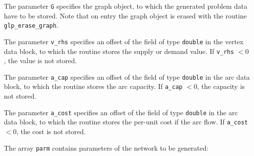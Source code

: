 The parameter \verb|G| specifies the graph object, to which the
generated  problem data have to be stored. Note that on entry the graph
object  is erased with the routine \verb|glp_erase_graph|.

The parameter \verb|v_rhs| specifies an offset of the field of type
\verb|double| in the vertex data block, to which the routine stores the
supply or  demand value. If \verb|v_rhs| $<0$, the value is not stored.

The parameter \verb|a_cap| specifies an offset of the field of type
\verb|double| in the arc data block, to which the routine stores the
arc capacity. If \verb|a_cap| $<0$, the capacity is not stored.

The parameter \verb|a_cost| specifies an offset of the field of type
\verb|double| in the arc data block, to which the routine stores the
per-unit cost if the arc flow. If \verb|a_cost| $<0$, the cost is not
stored.

The array \verb|parm| contains parameters of the network to be
generated:

